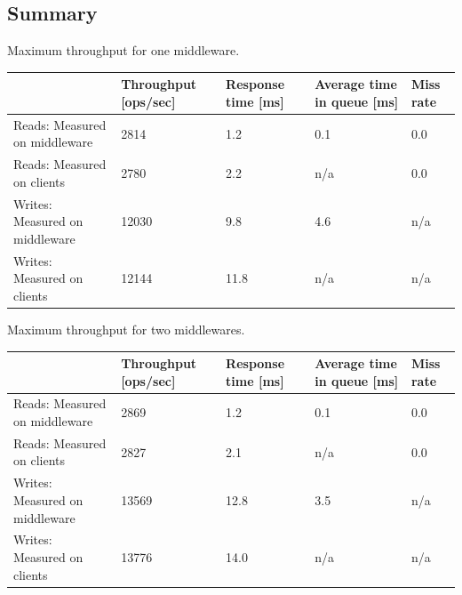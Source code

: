 \documentclass[report.tex]{subfiles}
\begin{document}
\subsection{Summary}

\begin{center}
	{Maximum throughput for one middleware.}
	\begin{tabular}{|l|p{2cm}|p{2cm}|p{2cm}|p{2cm}|}
		\hline                                & Throughput [ops/sec] & Response time [ms] & Average time in queue [ms] & Miss rate \\ 
		\hline Reads: Measured on middleware  &                 2814 &                1.2 &                        0.1 & 0.0       \\ 
		\hline Reads: Measured on clients     &                 2780 &                2.2 &                        n/a & 0.0       \\ 
		\hline Writes: Measured on middleware &                12030 &                9.8 &                        4.6 & n/a       \\ 
		\hline Writes: Measured on clients    &                12144 &                11.8 &                       n/a & n/a       \\ 
		\hline 
	\end{tabular}
\end{center}

\begin{center}
	{Maximum throughput for two middlewares.}
	\begin{tabular}{|l|p{2cm}|p{2cm}|p{2cm}|p{2cm}|}
		\hline                                & Throughput [ops/sec] & Response time [ms] & Average time in queue [ms] & Miss rate \\ 
		\hline Reads: Measured on middleware  &                 2869 &                1.2 &                        0.1 & 0.0       \\ 
		\hline Reads: Measured on clients     &                 2827 &                2.1 &                        n/a & 0.0       \\ 
		\hline Writes: Measured on middleware &                13569 &               12.8 &                        3.5 & n/a       \\ 
		\hline Writes: Measured on clients    &                13776 &               14.0 &                        n/a & n/a       \\ 
		\hline 
	\end{tabular}
\end{center}
\end{document}
